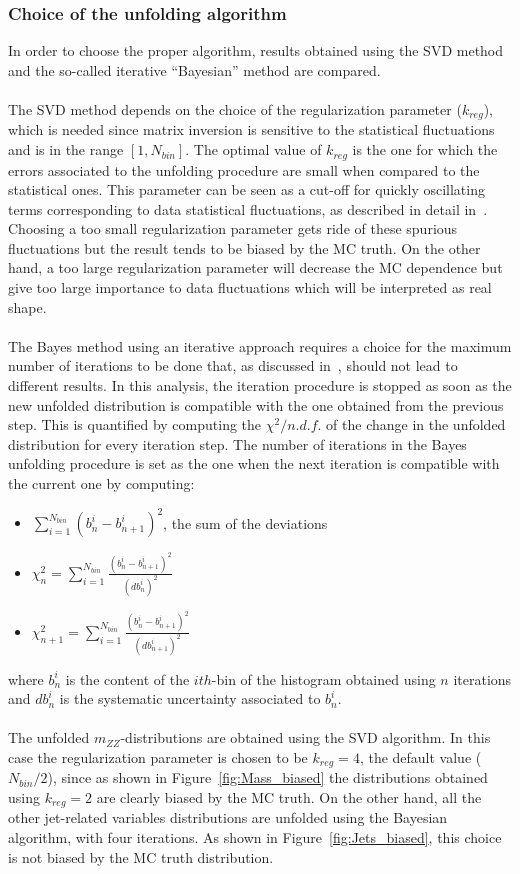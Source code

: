 \subsubsection{Choice of the unfolding algorithm}
In order to choose the proper algorithm, results obtained using the SVD method and the so-called iterative ``Bayesian'' method are compared.\\
\\
The SVD method depends on the choice of the regularization parameter ($k_{reg}$), which is needed since matrix inversion is sensitive to the statistical fluctuations and is in the range $[1,N_{bin}]$. The optimal value of $k_{reg}$ is the one for which the errors associated to the unfolding procedure are small when compared to the statistical ones. This parameter can be seen as a cut-off for quickly oscillating terms corresponding to data statistical fluctuations,  as described in detail in~\cite{SVD}.\\  %
Choosing a too small regularization parameter gets ride of these spurious fluctuations but the result tends to be biased by the MC truth. On the other hand, a too large regularization parameter will decrease the MC dependence but give too large importance to data fluctuations which will be interpreted as real shape.\\    
\\
The Bayes method using an iterative approach requires a choice for the maximum number of iterations to be done that, as discussed in~\cite{DAgostini}, 
should not lead to different results. In this analysis, the iteration procedure is stopped as soon as the new unfolded distribution is compatible
with the one obtained from the previous step. This is quantified by computing the $\chi ^2/n.d.f.$ of the change in the unfolded distribution for every iteration step.
The number of iterations in the Bayes unfolding procedure is set as the one when the next iteration is compatible with the current one by computing:
\begin{itemize}
\item $\sum_{i = 1}^{N_{bin}} (b_n^i - b_{n+1}^i)^2$, the sum of the deviations
\item $\chi_{n}^2 = \sum_{i = 1}^{N_{bin}} \frac{(b_n^i - b_{n+1}^i)^2}{(db_n^i)^2}$
 \item $\chi_{n+1}^2 = \sum_{i = 1}^{N_{bin}} \frac{(b_n^i - b_{n+1}^i)^2}{(db_{n+1}^i)^2}$
\end{itemize}
where $b^i_n$ is the content of the $ith$-bin of the histogram obtained using $n$ iterations and $db_{n}^i$ is the systematic uncertainty associated to  $b^i_n$.\\
\\
The unfolded $m_{ZZ}$-distributions are obtained using the SVD algorithm. In this case the regularization parameter is chosen to be $k_{reg} = 4$, the default value
($N_{bin}/2$), since as shown in Figure~\ref{fig:Mass_biased} the distributions obtained using $k_{reg} = 2$ are clearly biased by the MC truth. On the other hand, all the other jet-related variables distributions are unfolded using the Bayesian algorithm, with four iterations. As shown in Figure~\ref{fig:Jets_biased}, this choice is not biased by the MC truth distribution.\\

